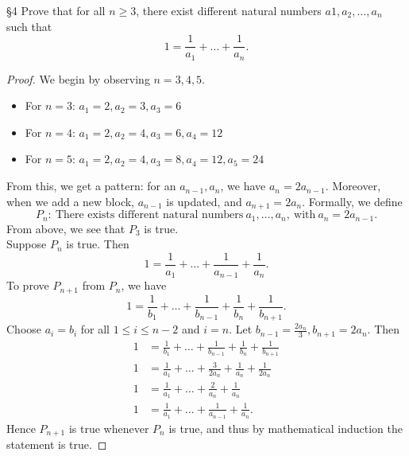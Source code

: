 \documentclass{homework}
\begin{document}
\begin{problem}{\S 4}
  Prove that for all $n\ge 3$, there exist different natural numbers $a1,a_2,\ldots, a_n$ such that
  \[
    1 = \frac{1}{a_1} + \ldots + \frac{1}{a_n}
  .\] 
\end{problem}
\begin{proof}[Proof]
  We begin by observing $n=3,4,5$.
   \begin{itemize}
    \item For $n=3$:  $ a_1=2,a_2=3,a_3=6$
    \item For $n=4$:  $ a_1=2,a_2=4,a_3=6,a_4=12$
    \item For $n=5$:  $ a_1=2,a_2=4,a_3=8,a_4=12,a_5=24$
  \end{itemize}
  From this, we get a pattern: for an $a_{n-1},a_n$, we have  $a_n = 2a_{n-1}$. Moreover, when we
  add a new block,  $a_{n-1}$ is updated, and $a_{n+1}=2a_n$. Formally, we define  \[
    P_n: ~\text{There exists different natural numbers}~a_1,\ldots, a_n, ~\text{with}~a_n=2a_{n-1}
  .\] 
  From above, we see that $P_3$ is true.\\
  Suppose $P_n$ is true. Then  \[
    1 = \frac{1}{a_1}  +\ldots+\frac{1}{a_{n-1}}+\frac{1}{a_n}
  .\] To prove $P_{n+1}$ from  $P_n$, we have  \[
  1 = \frac{1}{b_1} + \ldots+\frac{1}{b_{n-1}} + \frac{1}{b_n} + \frac{1}{b_{n+1}}
.\] Choose $a_i=b_i$ for all  $1\le i\le n-2$ and $i=n$. Let  $b_{n-1}=\frac{2a_n}{3},
  b_{n+1}=2a_n$. Then
  \begin{align*}
    1 &= \frac{1}{b_1}+\ldots+\frac{1}{b_{n-1}}+\frac{1}{b_n}+\frac{1}{b_{n+1}} \\
    1 &= \frac{1}{a_1}+\ldots+\frac{3}{2a_n}+\frac{1}{a_n}+\frac{1}{2a_n} \\
    1 &= \frac{1}{a_1}+\ldots+\frac{2}{a_n}+\frac{1}{a_n} \\
    1 &= \frac{1}{a_1}+\ldots+\frac{1}{a_{n-1}}+\frac{1}{a_n}
  .\end{align*}
  Hence $P_{n+1}$ is true whenever  $P_n$ is true, and thus by mathematical induction the statement
  is true.
\end{proof}
\end{document}
